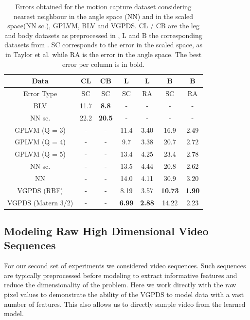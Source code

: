 \documentclass{article} %
\begin{document}
\begin{table}[h]
\caption{
\small{
Errors obtained for the motion capture dataset considering nearest neighbour in the angle space (NN) and in the scaled space(NN sc.), GPLVM, BLV and VGPDS. CL / CB are the leg and body datasets as preprocessed in \cite{Taylor}, L and B the corresponding datasets from \cite{gplvmLarger}. SC corresponds to the error in the scaled space, as in Taylor et al. while RA is the error in the angle space. The best error per column is in bold. }}
\label{motionCaptureTable}
\begin{center}
\begin{tabular}{c||c|c|c|c|c|c}
Data & CL & CB & L & L & B & B \\  \hline
Error Type & SC & SC & SC & RA & SC & RA \\
\hline \hline
BLV 			       & 11.7 & \textbf{8.8} & - & - & - & - \\  \hline
NN sc.   		       & 22.2 & \textbf{20.5} & - & - & - & - \\ \hline
GPLVM (Q = 3)	       & - & - & 11.4 & 3.40 & 16.9 & 2.49 \\ \hline
GPLVM (Q = 4)	       & - & - & 9.7  & 3.38 & 20.7 & 2.72 \\ \hline
GPLVM (Q = 5)	       & - & - & 13.4 & 4.25 & 23.4 & 2.78 \\ \hline
NN sc.  		       & - & - & 13.5 & 4.44 & 20.8 & 2.62 \\ \hline
NN 		 		       & - & - & 14.0 & 4.11 & 30.9 & 3.20 \\ \hline
VGPDS (RBF)        & - & - & 8.19 & 3.57 & \textbf{10.73} & \textbf{1.90} \\ \hline
VGPDS (Matern 3/2) & - & - & \textbf{6.99} & \textbf{2.88} & 14.22 & 2.23 \\
\end{tabular}
\end{center}
\end{table}


\subsection{Modeling Raw High Dimensional Video Sequences}

For our second set of experiments we considered video sequences. Such
sequences are typically preprocessed before modeling to extract
informative features and reduce the dimensionality of the
problem. Here we work directly with the raw pixel values to
demonstrate the ability of the VGPDS to model data with a vast number
of features. This also allows us to directly sample video from the
learned model.
\end{document}
